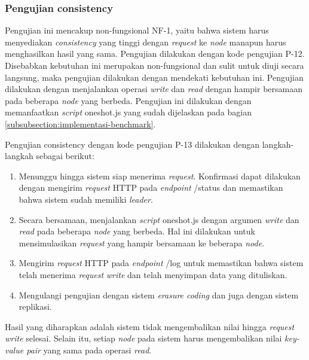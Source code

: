 \subsubsection{Pengujian consistency}
\label{subsubsection:pengujian-consistency}

Pengujian ini mencakup non-fungsional NF-1, yaitu bahwa sistem harus menyediakan \textit{consistency} yang tinggi dengan \textit{request} ke \textit{node} manapun harus menghasilkan hasil yang sama. Pengujian dilakukan dengan kode pengujian P-12. Disebabkan kebutuhan ini merupakan non-fungsional dan sulit untuk diuji secara langsung, maka pengujian dilakukan dengan mendekati kebutuhan ini. Pengujian dilakukan dengan menjalankan operasi \textit{write} dan \textit{read} dengan hampir bersamaan pada beberapa \textit{node} yang berbeda. Pengujian ini dilakukan dengan memanfaatkan \textit{script} oneshot.js yang sudah dijelaskan pada bagian \ref{subsubsection:implementasi-benchmark}.

Pengujian consistency dengan kode pengujian P-13 dilakukan dengan langkah-langkah sebagai berikut:
\begin{enumerate}
    \item Menunggu hingga sistem siap menerima \textit{request}. Konfirmasi dapat dilakukan dengan mengirim \textit{request} HTTP pada \textit{endpoint} /status dan memastikan bahwa sistem sudah memiliki \textit{leader}.
    \item Secara bersamaan, menjalankan \textit{script} oneshot.js dengan argumen \textit{write} dan \textit{read} pada beberapa \textit{node} yang berbeda. Hal ini dilakukan untuk mensimulasikan \textit{request} yang hampir bersamaan ke beberapa \textit{node}.
    \item Mengirim \textit{request} HTTP pada \textit{endpoint} /log untuk memastikan bahwa sistem telah menerima \textit{request} \textit{write} dan telah menyimpan data yang dituliskan.
    \item Mengulangi pengujian dengan sistem \textit{erasure coding} dan juga dengan sistem replikasi.
\end{enumerate}

Hasil yang diharapkan adalah sistem tidak mengembalikan nilai hingga \textit{request} \textit{write} selesai. Selain itu, setiap \textit{node} pada sistem harus mengembalikan nilai \textit{key-value pair} yang sama pada operasi \textit{read}.
